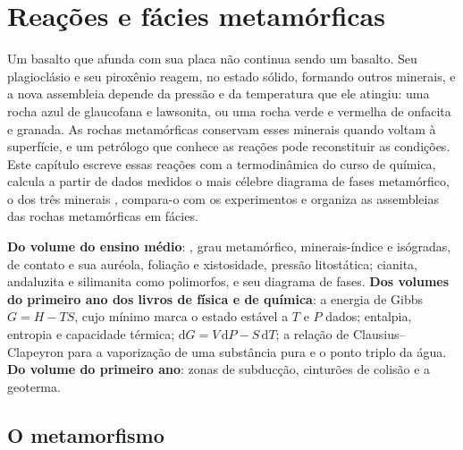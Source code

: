 \chapter{Reações e fácies metamórficas}\label{ch:b2:metamorphic-facies}

Um basalto que afunda com sua placa não continua sendo um basalto. Seu plagioclásio e seu piroxênio
reagem, no estado sólido, formando outros minerais, e a nova assembleia depende da
pressão e da temperatura que ele atingiu: uma rocha azul de glaucofana e lawsonita, ou uma
rocha verde e vermelha de onfacita e granada. As rochas metamórficas conservam esses minerais quando
voltam à superfície, e um petrólogo que conhece as reações pode reconstituir as
condições. Este capítulo escreve essas reações com a termodinâmica do
curso de química, calcula a partir de dados medidos o mais célebre diagrama de fases metamórfico,
o dos três minerais , compara-o com os experimentos e organiza as
assembleias das rochas metamórficas em fácies.

\begin{recall}
\textbf{Do volume do ensino médio}: , grau metamórfico, minerais-índice
e isógradas,  de contato e sua auréola, foliação e xistosidade,
pressão litostática; cianita, andaluzita e silimanita como polimorfos, e seu
diagrama de fases. \textbf{Dos volumes do primeiro ano dos livros de física e de química}: a energia
de Gibbs $G = H - TS$, cujo mínimo marca o estado estável a $T$ e $P$ dados;
entalpia, entropia e capacidade térmica; $\mathrm dG = V\,\mathrm dP - S\,\mathrm dT$; a
relação de Clausius--Clapeyron para a vaporização de uma substância pura e o ponto
triplo da água. \textbf{Do volume do primeiro ano}: zonas de subducção, cinturões de colisão e
a geoterma.
\end{recall}

\section{O metamorfismo}\label{sec:b2:metamorphic-facies:metamorphism}

